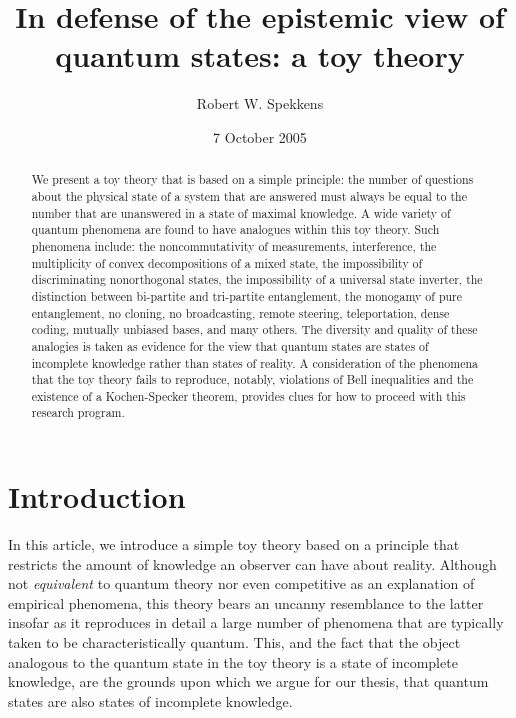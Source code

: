 \documentclass[pra,nofootinbib,showpacs,12pt]{revtex4}
\begin{document}
\author{Robert W. Spekkens}
\address{Perimeter Institute for Theoretical Physics,\\
31 Caroline St.~North, Waterloo, Canada N2L 2Y5}
\title{In defense of the epistemic view of quantum states: a toy theory}
\date{7 October 2005}

\begin{abstract}
We present a toy theory that is based on a simple principle: the
number of questions about the physical state of a system that are
answered must always be equal to the number that are unanswered in
a state of maximal knowledge. A wide variety of quantum phenomena
are found to have analogues within this toy theory. Such phenomena
include: the noncommutativity of measurements, interference, the
multiplicity of convex decompositions of a mixed state, the
impossibility of discriminating nonorthogonal states, the
impossibility of a universal state inverter, the distinction
between bi-partite and tri-partite entanglement, the monogamy of
pure entanglement, no cloning, no broadcasting, remote steering,
teleportation, dense coding, mutually unbiased bases, and many
others. The diversity and quality of these analogies is taken as
evidence for the view that quantum states are states of incomplete
knowledge rather than states of reality. A consideration of the
phenomena that the toy theory fails to reproduce, notably,
violations of Bell inequalities and the existence of a
Kochen-Specker theorem, provides clues for how to proceed with
this research program.
\end{abstract}

\maketitle

\newpage
\tableofcontents
\newpage

\section{Introduction}

\label{intro}

In this article, we introduce a simple toy theory based on a principle that
restricts the amount of knowledge an observer can have about reality.
Although not \emph{equivalent} to quantum theory nor even competitive as an
explanation of empirical phenomena, this theory bears an uncanny resemblance
to the latter insofar as it reproduces in detail a large number of phenomena
that are typically taken to be characteristically quantum. This, and the
fact that the object analogous to the quantum state in the toy theory is a
state of incomplete knowledge, are the grounds upon which we argue for our
thesis, that quantum states are also states of incomplete knowledge.
\end{document}

